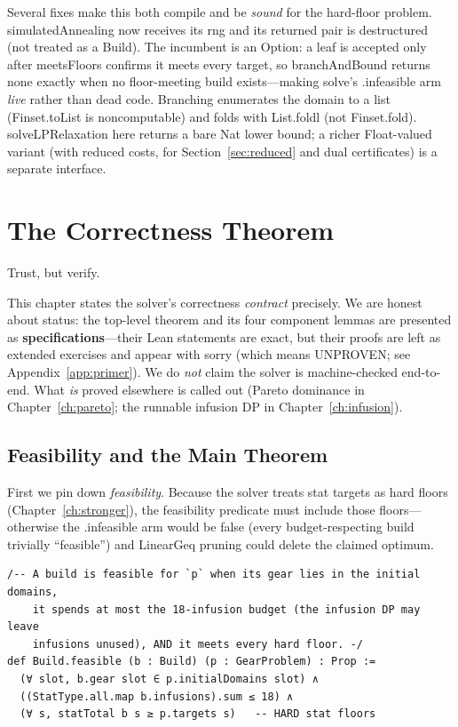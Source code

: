 \documentclass[11pt, a4paper, oneside]{book}
\newcommand{\li}[1]{{\ttfamily\small\color{deepblue}#1}}
\begin{document}
Several fixes make this both compile and be \emph{sound} for the hard-floor
problem.  \li{simulatedAnnealing} now receives its \li{rng} and its returned
pair is destructured (not treated as a \li{Build}).  The incumbent is an
\li{Option}: a leaf is accepted only after \li{meetsFloors} confirms it meets
every target, so \li{branchAndBound} returns \li{none} exactly when no
floor-meeting build exists---making \li{solve}'s \li{.infeasible} arm
\emph{live} rather than dead code.  Branching enumerates the domain to a list
(\li{Finset.toList} is noncomputable) and folds with \li{List.foldl} (not
\li{Finset.fold}).  \li{solveLPRelaxation} here returns a bare \li{Nat} lower
bound; a richer \li{Float}-valued variant (with reduced costs, for
Section~\ref{sec:reduced} and dual certificates) is a separate interface.

\chapter{The Correctness Theorem}
\label{ch:correctness}

\epigraph{Trust, but verify.}{}

This chapter states the solver's correctness \emph{contract} precisely.  We are
honest about status: the top-level theorem and its four component lemmas are
presented as \textbf{specifications}---their Lean statements are exact, but their
proofs are left as extended exercises and appear with \li{sorry} (which means
UNPROVEN; see Appendix~\ref{app:primer}).  We do \emph{not} claim the solver is
machine-checked end-to-end.  What \emph{is} proved elsewhere is called out
(Pareto dominance in Chapter~\ref{ch:pareto}; the runnable infusion DP in
Chapter~\ref{ch:infusion}).

\section{Feasibility and the Main Theorem}

First we pin down \emph{feasibility}.  Because the solver treats stat targets as
hard floors (Chapter~\ref{ch:stronger}), the feasibility predicate must include
those floors---otherwise the \li{.infeasible} arm would be false (every
budget-respecting build trivially ``feasible'') and \li{LinearGeq} pruning could
delete the claimed optimum.

\begin{leanbox}[title={Lean 4 (Mathlib) --- Feasibility (with hard floors)}]
\begin{verbatim}
/-- A build is feasible for `p` when its gear lies in the initial domains,
    it spends at most the 18-infusion budget (the infusion DP may leave
    infusions unused), AND it meets every hard floor. -/
def Build.feasible (b : Build) (p : GearProblem) : Prop :=
  (∀ slot, b.gear slot ∈ p.initialDomains slot) ∧
  ((StatType.all.map b.infusions).sum ≤ 18) ∧
  (∀ s, statTotal b s ≥ p.targets s)   -- HARD stat floors
\end{verbatim}
\end{leanbox}
\end{document}
